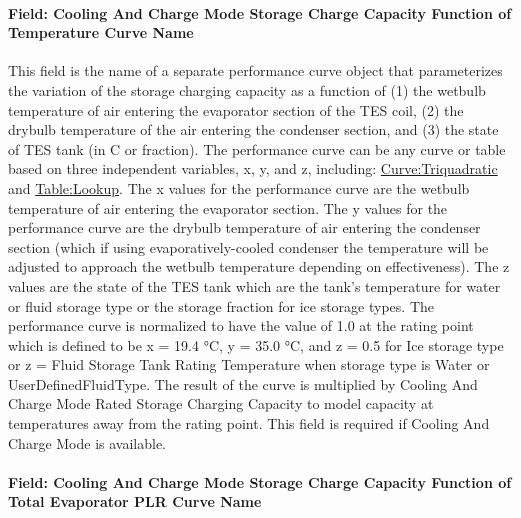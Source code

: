 \paragraph{Field: Cooling And Charge Mode Storage Charge Capacity Function of Temperature Curve Name}\label{field-cooling-and-charge-mode-storage-charge-capacity-function-of-temperature-curve-name}

This field is the name of a separate performance curve object that parameterizes the variation of the storage charging capacity as a function of (1) the wetbulb temperature of air entering the evaporator section of the TES coil, (2) the drybulb temperature of the air entering the condenser section, and (3) the state of TES tank (in C or fraction). The performance curve can be any curve or table based on three independent variables, x, y, and z, including: \hyperref[curvetriquadratic]{Curve:Triquadratic} and \hyperref[tablelookup]{Table:Lookup}. The x values for the performance curve are the wetbulb temperature of air entering the evaporator section. The y values for the performance curve are the drybulb temperature of air entering the condenser section (which if using evaporatively-cooled condenser the temperature will be adjusted to approach the wetbulb temperature depending on effectiveness). The z values are the state of the TES tank which are the tank's temperature for water or fluid storage type or the storage fraction for ice storage types. The performance curve is normalized to have the value of 1.0 at the rating point which is defined to be x = 19.4 °C, y = 35.0 °C, and z = 0.5 for Ice storage type or z = Fluid Storage Tank Rating Temperature when storage type is Water or UserDefinedFluidType. The result of the curve is multiplied by Cooling And Charge Mode Rated Storage Charging Capacity to model capacity at temperatures away from the rating point. This field is required if Cooling And Charge Mode is available.

\paragraph{Field: Cooling And Charge Mode Storage Charge Capacity Function of Total Evaporator PLR Curve Name}\label{field-cooling-and-charge-mode-storage-charge-capacity-function-of-total-evaporator-plr-curve-name}

